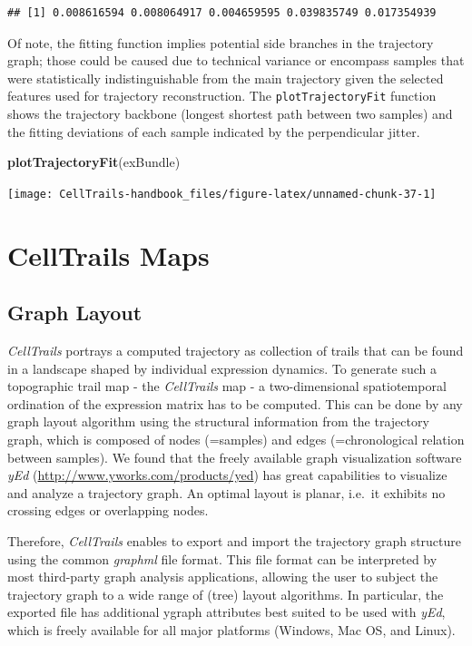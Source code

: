 \documentclass[]{book}
\newenvironment{Shaded}{\begin{snugshade}}{\end{snugshade}}
\newcommand{\KeywordTok}[1]{\textcolor[rgb]{0.13,0.29,0.53}{\textbf{#1}}}
\newcommand{\NormalTok}[1]{#1}
\theoremstyle{definition}
\theoremstyle{definition}
\theoremstyle{definition}
\theoremstyle{remark}
\begin{document}
\begin{verbatim}
## [1] 0.008616594 0.008064917 0.004659595 0.039835749 0.017354939
\end{verbatim}

Of note, the fitting function implies potential side branches in the
trajectory graph; those could be caused due to technical variance or
encompass samples that were statistically indistinguishable from the
main trajectory given the selected features used for trajectory
reconstruction. The \texttt{plotTrajectoryFit} function shows the
trajectory backbone (longest shortest path between two samples) and the
fitting deviations of each sample indicated by the perpendicular jitter.

\begin{Shaded}
\begin{Highlighting}[]
\KeywordTok{plotTrajectoryFit}\NormalTok{(exBundle)}
\end{Highlighting}
\end{Shaded}

\texttt{[image: CellTrails-handbook\_files/figure-latex/unnamed-chunk-37-1]}

\chapter{CellTrails Maps}\label{celltrails-maps}

\section{Graph Layout}\label{graph-layout}

\emph{CellTrails} portrays a computed trajectory as collection of trails
that can be found in a landscape shaped by individual expression
dynamics. To generate such a topographic trail map - the
\emph{CellTrails} map - a two-dimensional spatiotemporal ordination of
the expression matrix has to be computed. This can be done by any graph
layout algorithm using the structural information from the trajectory
graph, which is composed of nodes (=samples) and edges (=chronological
relation between samples). We found that the freely available graph
visualization software \emph{yEd}
(\url{http://www.yworks.com/products/yed}) has great capabilities to
visualize and analyze a trajectory graph. An optimal layout is planar,
i.e.~it exhibits no crossing edges or overlapping nodes.

Therefore, \emph{CellTrails} enables to export and import the trajectory
graph structure using the common \emph{graphml} file format. This file
format can be interpreted by most third-party graph analysis
applications, allowing the user to subject the trajectory graph to a
wide range of (tree) layout algorithms. In particular, the exported file
has additional ygraph attributes best suited to be used with \emph{yEd},
which is freely available for all major platforms (Windows, Mac OS, and
Linux).
\end{document}
